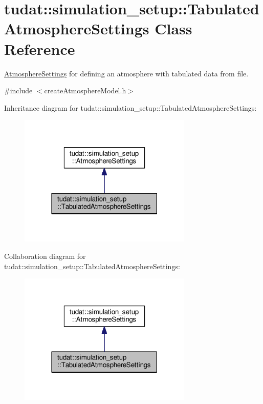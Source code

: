 \hypertarget{classtudat_1_1simulation__setup_1_1TabulatedAtmosphereSettings}{}\section{tudat\+:\+:simulation\+\_\+setup\+:\+:Tabulated\+Atmosphere\+Settings Class Reference}
\label{classtudat_1_1simulation__setup_1_1TabulatedAtmosphereSettings}


\hyperlink{classtudat_1_1simulation__setup_1_1AtmosphereSettings}{Atmosphere\+Settings} for defining an atmosphere with tabulated data from file.  




{\ttfamily \#include $<$create\+Atmosphere\+Model.\+h$>$}



Inheritance diagram for tudat\+:\+:simulation\+\_\+setup\+:\+:Tabulated\+Atmosphere\+Settings\+:
\nopagebreak
\begin{figure}[H]
\begin{center}
\leavevmode
\includegraphics[width=234pt]{classtudat_1_1simulation__setup_1_1TabulatedAtmosphereSettings__inherit__graph}
\end{center}
\end{figure}


Collaboration diagram for tudat\+:\+:simulation\+\_\+setup\+:\+:Tabulated\+Atmosphere\+Settings\+:
\nopagebreak
\begin{figure}[H]
\begin{center}
\leavevmode
\includegraphics[width=234pt]{classtudat_1_1simulation__setup_1_1TabulatedAtmosphereSettings__coll__graph}
\end{center}
\end{figure}
